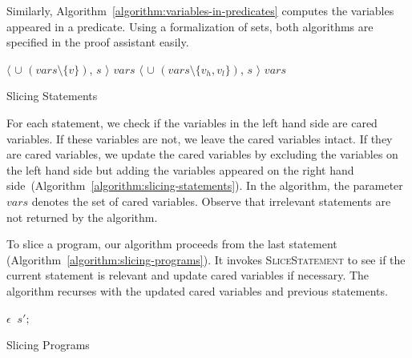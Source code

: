 Similarly, Algorithm~\ref{algorithm:variables-in-predicates} computes
the variables appeared in a predicate. Using a \coq formalization of
sets, both algorithms are specified in the proof assistant easily.

\begin{algorithm}[ht]
  \begin{algorithmic}[1]
          {\Return $\langle$
             $\cup$ $(\mathit{vars} \setminus \{
            v \})$, $s$ $\rangle$}
          {\Return $\mathit{vars}$}
      \EndCase
          {\Return $\langle$
             $\cup$ $(\mathit{vars} \setminus \{
            v_h, v_l \})$, $s$ $\rangle$}
          {\Return $\mathit{vars}$}
      \EndCase
    \EndMatch
    \EndFunction
  \end{algorithmic}
  \caption{Slicing Statements}
  \label{algorithm:slicing-statements}
\end{algorithm}

For each statement, we check if the variables in the left hand side are
cared variables. If these variables are not, we leave the cared
variables intact. If they are cared variables, we update the cared
variables by excluding the variables on the left hand side but adding
the variables appeared on the right hand
side~(Algorithm~\ref{algorithm:slicing-statements}). In the algorithm, 
the parameter $\mathit{vars}$ denotes the set of cared variables.
Observe that irrelevant statements are not returned by the algorithm.

To slice a program, our algorithm proceeds from the last statement
(Algorithm~\ref{algorithm:slicing-programs}). It invokes
\textsc{SliceStatement} to see if the current statement is relevant
and update cared variables if necessary. The algorithm recurses with
the updated cared variables and previous statements.

\begin{algorithm}[ht]
  \begin{algorithmic}[1]
      \Case{$\epsilon$}
        \Return $\epsilon$
      \EndCase
            \Return {}
          \EndCase
            \Return {}$\ s';$
          \EndCase
        \EndMatch
      \EndCase
    \EndMatch
    \EndFunction
  \end{algorithmic}
  \caption{Slicing Programs}
  \label{algorithm:slicing-programs}
\end{algorithm}

